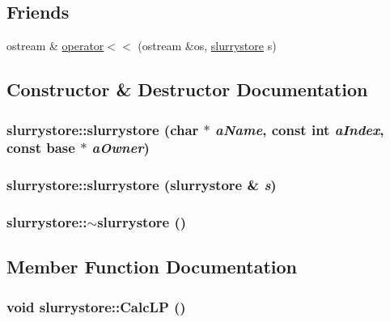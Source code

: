 \subsection*{Friends}
\begin{DoxyCompactItemize}
\item 
ostream \& \hyperlink{classslurrystore_a74247370258ba08c974e190aca4ed0a5}{operator$<$$<$} (ostream \&os, \hyperlink{classslurrystore}{slurrystore} s)
\end{DoxyCompactItemize}


\subsection{Constructor \& Destructor Documentation}
\hypertarget{classslurrystore_a57c19869f0be17c2dcf209918d75bb59}{
\subsubsection[{slurrystore}]{\setlength{\rightskip}{0pt plus 5cm}slurrystore::slurrystore (char $\ast$ {\em aName}, \/  const int {\em aIndex}, \/  const {\bf base} $\ast$ {\em aOwner})}}
\label{classslurrystore_a57c19869f0be17c2dcf209918d75bb59}
\hypertarget{classslurrystore_aa6fa3b3251ee847887d5e2a24e1453b9}{
\subsubsection[{slurrystore}]{\setlength{\rightskip}{0pt plus 5cm}slurrystore::slurrystore ({\bf slurrystore} \& {\em s})}}
\label{classslurrystore_aa6fa3b3251ee847887d5e2a24e1453b9}
\hypertarget{classslurrystore_a167fb914f18444bb763597eed3928aa6}{
\subsubsection[{$\sim$slurrystore}]{\setlength{\rightskip}{0pt plus 5cm}slurrystore::$\sim$slurrystore ()}}
\label{classslurrystore_a167fb914f18444bb763597eed3928aa6}


\subsection{Member Function Documentation}
\hypertarget{classslurrystore_a307b2de3fb81bd7adfa90335f6371816}{
\subsubsection[{CalcLP}]{\setlength{\rightskip}{0pt plus 5cm}void slurrystore::CalcLP ()}}
\label{classslurrystore_a307b2de3fb81bd7adfa90335f6371816}


